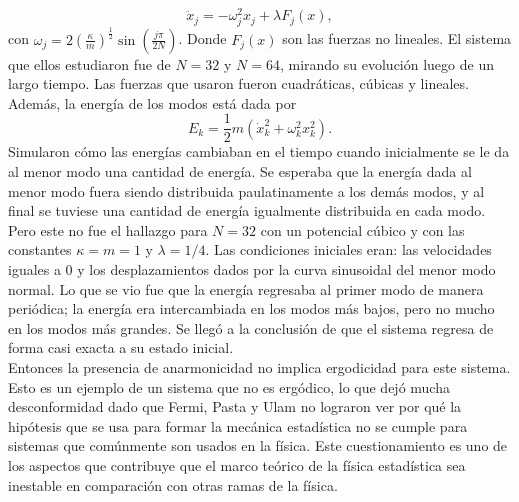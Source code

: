 \begin{equation}
\ddot{x}_{j}= - \omega_{j}^{2} x_{j} +\lambda F_{j}(x),
\end{equation}
con $\omega_{j} =2(\frac{\kappa }{m})^{\frac{1}{2}} \sin (\frac{j \pi}{2N})$. Donde $F_{j}(x)$ son las fuerzas no lineales. El sistema que ellos estudiaron fue de $N=32$ y $N=64$, mirando su evolución luego de un largo tiempo. Las fuerzas que usaron fueron cuadráticas, cúbicas y lineales. Además, la energía de los modos está dada por 
\begin{equation}
E_{k} = \frac{1}{2} m(\dot{x}^{2}_{k}+ \omega_{k}^{2}x_{k}^{2}).
\end{equation}
Simularon cómo las energías cambiaban en el tiempo cuando inicialmente se le da al menor modo una cantidad de energía. Se esperaba que la energía dada al menor modo fuera siendo distribuida paulatinamente a los demás modos, y al final se tuviese una cantidad de energía igualmente distribuida en cada modo. Pero este no fue el hallazgo para $N=32$ con un potencial cúbico y con las constantes $\kappa=m=1$ y $\lambda=1/4$. Las condiciones iniciales eran: las velocidades iguales a 0 y los desplazamientos dados por la curva sinusoidal del menor modo normal. Lo que se vio fue que la energía regresaba al primer modo de manera periódica; la energía era intercambiada en los modos más bajos, pero no mucho en los modos más grandes. Se llegó a la conclusión de que el sistema regresa de forma casi exacta a su estado inicial.  \\
Entonces la presencia de anarmonicidad no implica ergodicidad para este sistema. Esto es un ejemplo de un sistema que no es ergódico, lo que dejó mucha desconformidad dado que Fermi, Pasta y Ulam  no lograron  ver por qué la hipótesis que se usa para formar la mecánica estadística no se cumple para sistemas que comúnmente  son usados en la física. Este cuestionamiento es uno de los aspectos que contribuye que el marco teórico de la física estadística sea inestable en comparación con otras ramas de la física.


